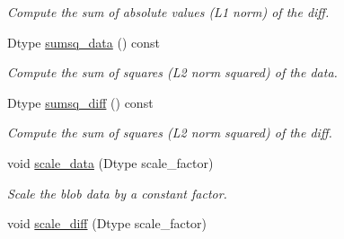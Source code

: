 \begin{DoxyCompactItemize}
\begin{DoxyCompactList}\small\item\em Compute the sum of absolute values (L1 norm) of the diff. \end{DoxyCompactList}\item 
Dtype \hyperlink{classcaffe_1_1Blob_a51e8e67d0445f9d8fe3d0bea71fd90b3}{sumsq\+\_\+data} () const \hypertarget{classcaffe_1_1Blob_a51e8e67d0445f9d8fe3d0bea71fd90b3}{}\label{classcaffe_1_1Blob_a51e8e67d0445f9d8fe3d0bea71fd90b3}

\begin{DoxyCompactList}\small\item\em Compute the sum of squares (L2 norm squared) of the data. \end{DoxyCompactList}\item 
Dtype \hyperlink{classcaffe_1_1Blob_a599d89dc42801233355b9cfd416e67b7}{sumsq\+\_\+diff} () const \hypertarget{classcaffe_1_1Blob_a599d89dc42801233355b9cfd416e67b7}{}\label{classcaffe_1_1Blob_a599d89dc42801233355b9cfd416e67b7}

\begin{DoxyCompactList}\small\item\em Compute the sum of squares (L2 norm squared) of the diff. \end{DoxyCompactList}\item 
void \hyperlink{classcaffe_1_1Blob_a535dd556e777f2e13b8c7438f40749a0}{scale\+\_\+data} (Dtype scale\+\_\+factor)\hypertarget{classcaffe_1_1Blob_a535dd556e777f2e13b8c7438f40749a0}{}\label{classcaffe_1_1Blob_a535dd556e777f2e13b8c7438f40749a0}

\begin{DoxyCompactList}\small\item\em Scale the blob data by a constant factor. \end{DoxyCompactList}\item 
void \hyperlink{classcaffe_1_1Blob_a6d2d83920d961fff033434347f64a3b0}{scale\+\_\+diff} (Dtype scale\+\_\+factor)\hypertarget{classcaffe_1_1Blob_a6d2d83920d961fff033434347f64a3b0}{}\label{classcaffe_1_1Blob_a6d2d83920d961fff033434347f64a3b0}


\end{DoxyCompactItemize}
